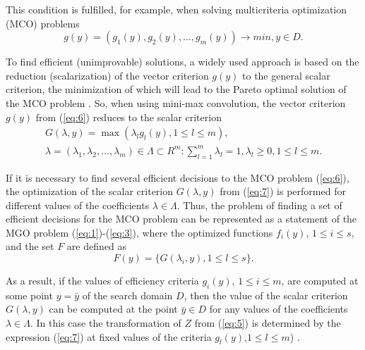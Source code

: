 \documentclass[review]{elsarticle}
\begin{document}
This condition is fulfilled, for example, when solving multicriteria optimization (MCO) problems 
\begin{equation}\label{eq:6}
g(y) = (g_1(y), g_2(y), \dots , g_m(y)) \to min,  y\in D.
\end{equation}

To find efficient (unimprovable) solutions, a widely used approach is based on the reduction (scalarization) of the vector criterion $g(y)$ to the general scalar criterion, the minimization of which will lead to the Pareto optimal solution of the MCO problem \cite{c29,c30,c31,c32,c33}. So, when using mini-max convolution, the vector criterion $g(y)$ from (\ref{eq:6}) reduces to the scalar criterion
\begin{equation}\label{eq:7}
\begin{matrix}
G(\lambda,y)=\max{(\lambda_l g_l(y),1 \leq l \leq m)},	\\
\lambda=(\lambda_1,\lambda_2,\dots,\lambda_m)\in \Lambda \subset R^m:\sum_{l=1}^m{\lambda_l =1},\lambda_l\geq 0,1 \leq l \leq m.
\end{matrix}
\end{equation}


If it is necessary to find several efficient decisions to the MCO problem (\ref{eq:6}), the optimization of the scalar criterion $G(\lambda,y)$ from (\ref{eq:7}) is performed for different values of the coefficients $\lambda \in \Lambda$. Thus, the problem of finding a set of efficient decisions for the MCO problem can be represented as a statement of the MGO problem (\ref{eq:1})-(\ref{eq:3}), where the optimized functions $f_i(y)$, $1 \leq i \leq s$, and the set $F$ are defined as
\begin{equation}\label{eq:8}
F(y)= \{ G(\lambda_i,y),1 \leq l \leq s\}.
\end{equation}

As a result, if the values of efficiency criteria $g_i(y)$, $1 \leq i \leq m$, are computed at some point $y=\bar{y}$ of the search domain $D$, then the value of the scalar criterion $G(\lambda,y)$ can be computed at the point $\bar{y} \in D$ for any values of the coefficients $\lambda \in \Lambda$. In this case the transformation of $Z$ from (\ref{eq:5}) is determined by the expression (\ref{eq:7}) at fixed values of the criteria $g_l (y)$,$1 \leq l \leq m$) \cite{c27,c28}.
\end{document}

